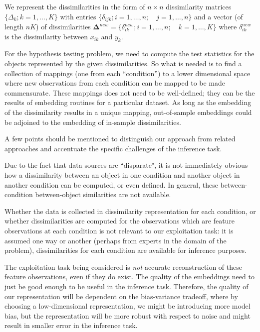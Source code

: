 \documentclass[12pt,oneside,final]{thesis}\usepackage[]{graphicx}\usepackage[]{color}
\begin{document}
We represent the dissimilarities in the form  of $n \times n$  dissimilarity matrices $\{\Delta_k;k=1,\ldots,K\}$ with entries $\{\delta_{ijk} ;  i=1,\ldots,n;\quad j=1,\ldots,n\}$  and a  vector (of length $nK$) of dissimilarities  $\mathbf{\Delta}^{new}=\{ \delta_{ik}^{new}; i=1,\ldots, n;\quad k=1,\ldots,K\}  $  where $\delta_{ik}^{new} $ is the dissimilarity  between  $x_{ik}$ and $y_k$.
 
 
For the hypothesis testing problem, we need to compute the test statistics for the objects represented by the given dissimilarities. So what is needed is to find a collection of mappings (one from each ``condition'') to a lower dimensional space where new observations from each condition can be mapped to be made commensurate. These mappings does not need to be  well-defined; they can be the results of embedding routines for a particular dataset. As long as the embedding of the dissimilarity results in a  unique mapping,  out-of-sample embeddings could be adjoined to the embedding of in-sample dissimilarities.

A few points should be mentioned to distinguish our approach from related approaches and accentuate the specific challenges of the inference task.
\begin{remark}
Due to the fact that data sources are ``disparate", it is not immediately obvious how  a dissimilarity between an object in one condition and another object in another condition  can be computed, or even defined.  In general, these between-condition between-object  similarities are not available.
\end{remark}
 
 \begin{remark}
 Whether the data is collected in dissimilarity representation for each condition, or whether dissimilarities are computed for the observations which are feature observations at each condition is not relevant to our exploitation task: it is assumed one way or another (perhaps from experts in the domain of the problem),  dissimilarities for each condition are available for inference purposes. 
\end{remark}

\begin{remark}
The exploitation task  being considered is \emph{not} accurate reconstruction of these feature observations, even if they do exist. The quality of the  embeddings need to just be  good enough to be useful in the inference task. Therefore, the quality of our representation will be dependent on the bias-variance tradeoff, where by choosing a low-dimensional representation, we might be introducing more model bias, but the representation will be more  robust with respect to noise and might result in smaller error in the inference task.
\end{remark}
\end{document}

